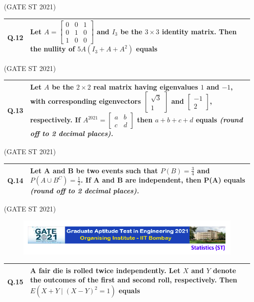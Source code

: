 \documentclass[journal,12pt,onecolumn]{IEEEtran}
\theoremstyle{remark}
\begin{document}
\bigskip
\hfill (GATE ST 2021)
\\

\begin{tabular}{|p{1cm}|p{14cm}|}
\hline

\textbf{Q.12} &
Let $A = \begin{bmatrix}
0 & 0 & 1 \\
0 & 1 & 0 \\
1 & 0 & 0
\end{bmatrix}$
and $I_3$ be the $3\times 3$ identity matrix. Then the nullity of $5A(I_3 + A + A^{2})$ equals \\
\hline
\end{tabular}

\bigskip
\hfill (GATE ST 2021)
\\

\begin{tabular}{|p{1cm}|p{14cm}|}
\hline
\textbf{Q.13} &
Let $A$ be the $2\times 2$ real matrix having eigenvalues $1$ and $-1$, with corresponding eigenvectors
$\begin{bmatrix} \sqrt{3} \\ 1 \end{bmatrix}$ and $\begin{bmatrix} -1\\ 2 \end{bmatrix}$, respectively. If 
$A^{2021} = \begin{bmatrix} a & b\\ c & d \end{bmatrix}$ then $a+b+c+d$ equals \textit{(round off to 2 decimal places).} \\ 
\hline
\end{tabular}

\bigskip
\hfill (GATE ST 2021)

\begin{tabular}{|p{1cm}|p{14cm}|}
\hline
\textbf{Q.14} &
Let A and B be two events such that $P(B) = \frac{3}{4}$ and $P(A \cup B^C) = \frac{1}{2}$. If A and B are independent, then P(A) equals \textit{(round off to 2 decimal places).}\\
\hline
\end{tabular}

\hfill (GATE ST 2021)

\newpage

\begin{figure}
\huge\centering
    \includegraphics[width=1\linewidth]{figs/0.png}
\end{figure}
\begin{tabular}{|p{1cm}|p{14cm}|}
\hline
\textbf{Q.15} &
A fair die is rolled twice independently. Let $X$ and $Y$ denote the outcomes of the first and second roll, respectively. Then $E(X + Y \mid (X-Y)^2 = 1)$ equals \\
\hline
 \end{tabular}
 
\end{document}
